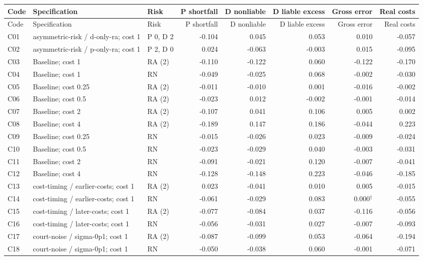 \documentclass[10pt]{article}
\begin{document}
\small\begin{longtable}{@{}lp{3.0in}lrrrrr@{}}
\toprule Code & Specification & Risk & P shortfall & D nonliable & D liable excess & Gross error & Real costs\\\midrule\endfirsthead
\toprule Code & Specification & Risk & P shortfall & D nonliable & D liable excess & Gross error & Real costs\\\midrule\endhead\bottomrule\endfoot
C01 & asymmetric-risk / d-only-ra; cost 1 & P 0, D 2 & -0.104 & 0.045 & 0.053 & 0.010 & -0.057\\
C02 & asymmetric-risk / p-only-ra; cost 1 & P 2, D 0 & 0.024 & -0.063 & -0.003 & 0.015 & -0.095\\
C03 & Baseline; cost 1 & RA (2) & -0.110 & -0.122 & 0.060 & -0.122 & -0.170\\
C04 & Baseline; cost 1 & RN & -0.049 & -0.025 & 0.068 & -0.002 & -0.030\\
C05 & Baseline; cost 0.25 & RA (2) & -0.011 & -0.010 & 0.001 & -0.016 & -0.002\\
C06 & Baseline; cost 0.5 & RA (2) & -0.023 & 0.012 & -0.002 & -0.001 & -0.014\\
C07 & Baseline; cost 2 & RA (2) & -0.107 & 0.041 & 0.106 & 0.005 & 0.002\\
C08 & Baseline; cost 4 & RA (2) & -0.189 & 0.147 & 0.186 & -0.044 & 0.223\\
C09 & Baseline; cost 0.25 & RN & -0.015 & -0.026 & 0.023 & -0.009 & -0.024\\
C10 & Baseline; cost 0.5 & RN & -0.023 & -0.029 & 0.040 & -0.003 & -0.031\\
C11 & Baseline; cost 2 & RN & -0.091 & -0.021 & 0.120 & -0.007 & -0.041\\
C12 & Baseline; cost 4 & RN & -0.128 & -0.148 & 0.223 & -0.046 & -0.185\\
C13 & cost-timing / earlier-costs; cost 1 & RA (2) & 0.023 & -0.041 & 0.010 & 0.005 & -0.015\\
C14 & cost-timing / earlier-costs; cost 1 & RN & -0.061 & -0.029 & 0.083 & 0.000$^{\dagger}$ & -0.055\\
C15 & cost-timing / later-costs; cost 1 & RA (2) & -0.077 & -0.084 & 0.037 & -0.116 & -0.056\\
C16 & cost-timing / later-costs; cost 1 & RN & -0.056 & -0.031 & 0.027 & -0.007 & -0.093\\
C17 & court-noise / sigma-0p1; cost 1 & RA (2) & -0.087 & -0.099 & 0.053 & -0.064 & -0.194\\
C18 & court-noise / sigma-0p1; cost 1 & RN & -0.050 & -0.038 & 0.060 & -0.001 & -0.071\\

\end{longtable}
\end{document}
